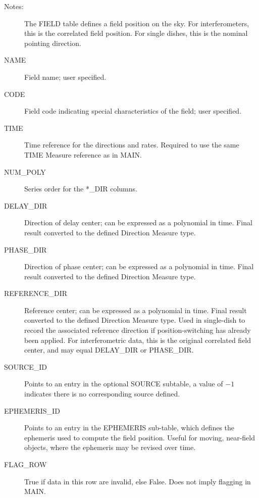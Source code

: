 \documentclass{article}
\begin{document}
\begin{description}

\item[Notes:] The FIELD table defines a field position on the sky. For
interferometers, this is the correlated field position. For single dishes,
this is the nominal pointing direction.

\item[NAME] Field name; user specified.

\item[CODE] Field code indicating special characteristics of the
field; user specified.

\item[TIME] Time reference for the directions and rates. Required to 
use the same TIME Measure reference as in MAIN.

\item[NUM\_POLY] Series order for the *\_DIR columns.

\item[DELAY\_DIR] Direction of delay center; can be expressed as a
polynomial in time. Final result converted to the defined Direction
Measure type.

\item[PHASE\_DIR] Direction of phase center; can be expressed as a
polynomial in time. Final result converted to the defined Direction
Measure type.

\item[REFERENCE\_DIR] Reference center; can be expressed as a
polynomial in time. Final result converted to the defined Direction
Measure type. Used in single-dish to record the associated reference
direction if position-switching has already been applied. For
interferometric data, this is the original correlated field center,
and may equal DELAY\_DIR or PHASE\_DIR.

\item[SOURCE\_ID] Points to an entry in the optional SOURCE subtable, a
value of $-1$ indicates there is no corresponding source defined.

\item[EPHEMERIS\_ID] Points to an entry in the EPHEMERIS sub-table,
which defines the ephemeris used to compute the field position. Useful
for moving, near-field objects, where the ephemeris may be revised over time.

\item[FLAG\_ROW] True if data in this row are invalid, else False. Does not
imply flagging in MAIN.

\end{description}
\end{document}

